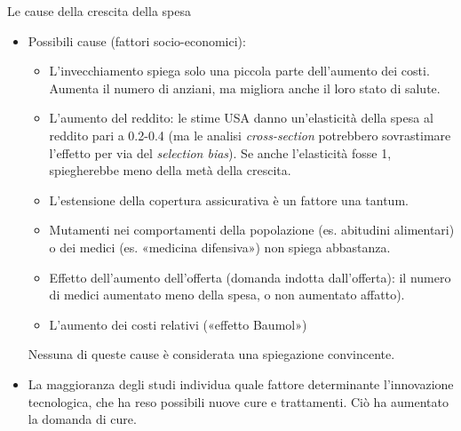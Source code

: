 \documentclass[aspectratio=64,11pt]{beamer}
\begin{document}
\begin{frame}{Le cause della crescita della spesa}
\begin{itemize}
\item Possibili cause (fattori socio-economici):
\begin{itemize}
\item L'\alert{invecchiamento} spiega solo una piccola parte dell'aumento dei
costi. Aumenta il numero di anziani, ma migliora anche il loro stato di
salute.
\item L'\alert{aumento del reddito}: le stime USA danno un'elasticità della spesa al
reddito pari a 0.2-0.4 (ma le analisi \emph{cross-section} potrebbero
sovrastimare l'effetto per via del \emph{selection bias}). Se anche
l'elasticità fosse 1, spiegherebbe meno della metà della crescita.
\item L'\alert{estensione della copertura assicurativa} è un fattore una tantum.
\item Mutamenti nei comportamenti della popolazione (es. abitudini alimentari) o
dei medici (es. «medicina difensiva») non spiega abbastanza.
\item Effetto dell'aumento dell'offerta (domanda indotta dall'offerta): il
numero di medici aumentato meno della spesa, o non aumentato affatto).
\item L'aumento dei costi relativi («effetto Baumol»)
\end{itemize}
Nessuna di queste cause è considerata una spiegazione convincente.
\item La maggioranza degli studi individua quale fattore determinante
l'\alert{innovazione tecnologica}, che ha reso possibili nuove cure e
trattamenti. Ciò ha aumentato la domanda di cure.
\end{itemize}
\end{frame}
\end{document}
